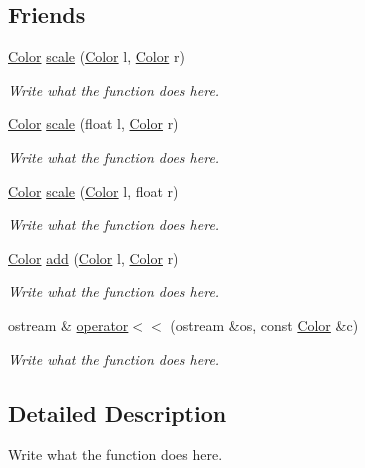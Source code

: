 \subsection*{Friends}
\begin{DoxyCompactItemize}
\item 
\hyperlink{structColor}{Color} \hyperlink{structColor_ac863751b53da826f397a0a3e1791214c}{scale} (\hyperlink{structColor}{Color} l, \hyperlink{structColor}{Color} r)
\begin{DoxyCompactList}\small\item\em Write what the function does here. \end{DoxyCompactList}\item 
\hyperlink{structColor}{Color} \hyperlink{structColor_a3685cef47e27d2bc22e8f4413762af7b}{scale} (float l, \hyperlink{structColor}{Color} r)
\begin{DoxyCompactList}\small\item\em Write what the function does here. \end{DoxyCompactList}\item 
\hyperlink{structColor}{Color} \hyperlink{structColor_a4e134c0253747f92e60466bddd4192f6}{scale} (\hyperlink{structColor}{Color} l, float r)
\begin{DoxyCompactList}\small\item\em Write what the function does here. \end{DoxyCompactList}\item 
\hyperlink{structColor}{Color} \hyperlink{structColor_ae9e42a457d5be803716a51d924225b95}{add} (\hyperlink{structColor}{Color} l, \hyperlink{structColor}{Color} r)
\begin{DoxyCompactList}\small\item\em Write what the function does here. \end{DoxyCompactList}\item 
ostream \& \hyperlink{structColor_a9fbacccb79591c83f4c62d0c65470ac4}{operator$<$$<$} (ostream \&os, const \hyperlink{structColor}{Color} \&c)
\begin{DoxyCompactList}\small\item\em Write what the function does here. \end{DoxyCompactList}\end{DoxyCompactItemize}


\subsection{Detailed Description}
Write what the function does here. 


